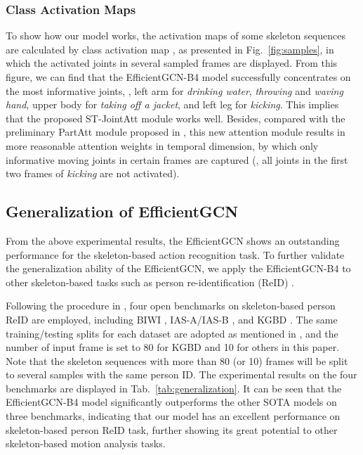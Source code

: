 \documentclass[10pt,journal,compsoc]{IEEEtran}
\begin{document}
\subsubsection{Class Activation Maps}
\label{sssec:cam}

To show how our model works, the activation maps of some skeleton sequences are calculated by class activation map \cite{learning2016zhou}, as presented in Fig.~\ref{fig:samples}, in which the activated joints in several sampled frames are displayed. From this figure, we can find that the EfficientGCN-B4 model successfully concentrates on the most informative joints, \ie, left arm for {\it drinking water}, {\it throwing} and {\it waving hand}, upper body for {\it taking off a jacket}, and left leg for {\it kicking}. This implies that the proposed ST-JointAtt module works well. Besides, compared with the preliminary PartAtt module proposed in \cite{song2020stronger}, this new attention module results in more reasonable attention weights in temporal dimension, by which only informative moving joints in certain frames are captured (\eg, all joints in the first two frames of {\it kicking} are not activated).

\subsection{Generalization of EfficientGCN}
\label{ssec:generalization}

From the above experimental results, the EfficientGCN shows an outstanding performance for the skeleton-based action recognition task. To further validate the generalization ability of the EfficientGCN, we apply the EfficientGCN-B4 to other skeleton-based tasks such as person re-identification (ReID) \cite{zhao2017spindle,rao2021self}.

Following the procedure in \cite{rao2021self}, four open benchmarks on skeleton-based person ReID are employed, including BIWI \cite{munaro2014one}, IAS-A/IAS-B \cite{munaro2014feature}, and KGBD \cite{andersson2015person}. The same training/testing splits for each dataset are adopted as mentioned in \cite{rao2021self}, and the number of input frame is set to 80 for KGBD and 10 for others in this paper. Note that the skeleton sequences with more than 80 (or 10) frames will be split to several samples with the same person ID. The experimental results on the four benchmarks are displayed in Tab.~\ref{tab:generalization}. It can be seen that the EfficientGCN-B4 model significantly outperforms the other SOTA models on three benchmarks, indicating that our model has an excellent performance on skeleton-based person ReID task, further showing its great potential to other skeleton-based motion analysis tasks.
\end{document}
